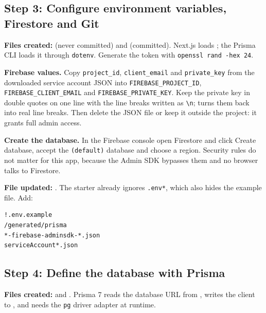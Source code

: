 \documentclass[11pt,a4paper]{article}
\begin{document}
\subsection*{Step 3: Configure environment variables, Firestore and Git}
\textbf{Files created:}  (never committed) and  (committed). Next.js loads ; the Prisma CLI loads it through \texttt{dotenv}. Generate the token with \texttt{openssl rand -hex 24}.

\textbf{Firebase values.} Copy \texttt{project\_id}, \texttt{client\_email} and \texttt{private\_key} from the downloaded service account JSON into \texttt{FIREBASE\_PROJECT\_ID}, \texttt{FIREBASE\_CLIENT\_EMAIL} and \texttt{FIREBASE\_PRIVATE\_KEY}. Keep the private key in double quotes on one line with the line breaks written as \texttt{\textbackslash n};  turns them back into real line breaks. Then delete the JSON file or keep it outside the project: it grants full admin access.

\textbf{Create the database.} In the Firebase console open Firestore and click Create database, accept the \texttt{(default)} database and choose a region. Security rules do not matter for this app, because the Admin SDK bypasses them and no browser talks to Firestore.

\textbf{File updated:} . The starter already ignores \texttt{.env*}, which also hides the example file. Add:
\begin{lstlisting}
!.env.example
/generated/prisma
*-firebase-adminsdk-*.json
serviceAccount*.json
\end{lstlisting}

\subsection*{Step 4: Define the database with Prisma}
\textbf{Files created:}  and . Prisma 7 reads the database URL from , writes the client to , and needs the \texttt{pg} driver adapter at runtime.
\end{document}
